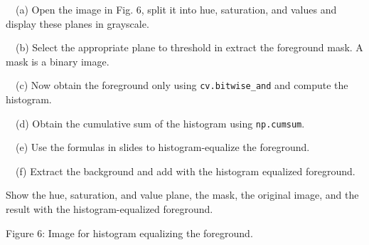 \documentclass[10pt]{article}
\begin{document}
~~(a) Open the image in Fig. 6, split it into hue, saturation, and
values and display these planes in grayscale.

~~(b) Select the appropriate plane to threshold in extract the
foreground mask. A mask is a binary image.

~~(c) Now obtain the foreground only using \texttt{cv.bitwise\_and} and
compute the histogram.

~~(d) Obtain the cumulative sum of the histogram using
\texttt{np.cumsum}.

~~(e) Use the formulas in slides to histogram-equalize the foreground.

~~(f) Extract the background and add with the histogram equalized
foreground.

Show the hue, saturation, and value plane, the mask, the original image,
and the result with the histogram-equalized foreground.

Figure 6: Image for histogram equalizing the foreground.
\end{document}
